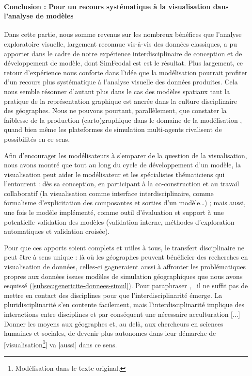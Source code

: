 \paragraph{Conclusion : Pour un recours systématique à la visualisation dans l'analyse de modèles}
Dans cette partie, nous somme revenus sur les nombreux bénéfices que l'analyse exploratoire visuelle, largement reconnue vis-à-vis des données classiques, a pu apporter dans le cadre de notre expérience interdisciplinaire de conception et de développement de modèle, dont SimFeodal est est le résultat.
Plus largement, ce retour d'expérience nous conforte dans l'idée que la modélisation pourrait profiter d'un recours plus systématique à l'analyse visuelle des données produites.
Cela nous semble résonner d'autant plus dans le cas des modèles spatiaux tant la pratique de la représentation graphique est ancrée dans la culture disciplinaire des géographes.
Nous ne pouvons pourtant, parallèlement, que constater la faiblesse de la production (carto)graphique dans le domaine de la modélisation \autocite[introduction, \ppno~N--N+2]{cura_visualisation_2020}, quand bien même les plateformes de simulation multi-agents rivalisent de possibilités en ce sens.

\noindent Afin d’encourager les modélisateurs à s’emparer de la question de la visualisation, nous avons montré que tout au long du cycle de développement d'un modèle, la visualisation peut aider le modélisateur et les spécialistes thématiciens qui l’entourent  :
dès sa conception, en participant à la co-construction et au travail collaboratif (la visualisation comme interface interdisciplinaire, comme formalisme d'explicitation des composantes et sorties d'un modèle\ldots) ;
mais aussi, une fois le modèle implémenté, comme outil d'évaluation et support à une potentielle validation des modèles (validation interne, méthodes d'exploration automatiques et validation croisée).

\noindent Pour que ces apports soient complets et utiles à tous, le transfert disciplinaire ne peut être à sens unique : là où les géographes peuvent bénéficier des recherches en visualisation de données, celles-ci gagneraient aussi à affronter les problématiques propres aux données issues modèles de simulation géographiques que nous avons esquissé (\cref{subsec:genericite-donnees-simul}).
Pour paraphraser \textcite[76]{banos_pour_2013}, \og il ne suffit pas de mettre en contact des disciplines pour que l’interdisciplinarité émerge.
La pluridisciplinarité s’en contente facilement, mais l’interdisciplinarité implique des interactions entre disciplines et par conséquent une nécessaire acculturation [...]
Donner les moyens aux géographes et, au delà, aux chercheurs en sciences humaines et sociales, de devenir plus autonomes dans leur démarche de [visualisation\footnote{
	\og Modélisation\fg{} dans le texte original.
}] va [aussi] dans ce sens\fg{}.

